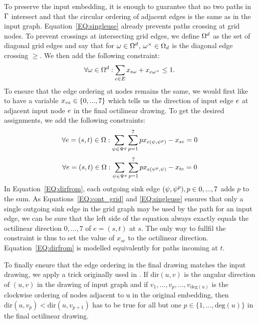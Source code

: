 \documentclass{sig-alternate-sigmod09}
\begin{document}
To preserve the input embedding, it is enough to guarantee that no two paths in $\Gamma$ intersect and that the circular ordering of adjacent edges is the same as in the input graph.
Equation~\ref{EQ:singleuse} already prevents paths crossing at grid nodes.
To prevent crossings at intersecting grid edges, we define $\Omega^d$ as the set of diagonal grid edges and say that for $\omega \in \Omega^d$, $\omega^{\times} \in \Omega_d$ is the diagonal edge crossing $\ge$. 
We then add the following constraint:
%
\begin{equation}
  \forall \ge \in \gE^d: \Psum{\ie \in \iE} \geused{\ie}{\ge} + \geused{\ie}{\ge^{\times}} \leq 1. \label{EQ:crossing}
\end{equation}
%
To ensure that the edge ordering at nodes remains the same, we would first like to have a variable $x_{ve} \in \{0, ..., 7\}$ which tells us the direction of input edge $e$ at adjacent input node $e$ in the final octilinear drawing.
To get the desired assignments, we add the following constraints:
%
\begin{equation}
  \forall e = (s, t) \in \Omega: \sum_{\psi \in \Psi^g} \sum_{p = 1}^7 p x_{e(\psi,  \psi^p)} - x_{se} = 0\label{EQ:dirfrom}
\end{equation}
\begin{equation}
  \forall e = (s, t) \in \Omega: \sum_{\psi \in \Psi^g} \sum_{p = 1}^7 p x_{e(\psi^p, \psi)} - x_{te} = 0\label{EQ:dirto}
\end{equation}
%
In Equation~\ref{EQ:dirfrom}, each outgoing sink edge $(\psi,  \psi^{p}), p \in {0, ..., 7}$ adds $p$ to the sum.
As Equations~\ref{EQ:cont_grid} and \ref{EQ:singleuse} ensures that only a single outgoing sink edge in the grid graph may be used by the path for an input edge, we can be sure that the left side of the equation always exactly equals the octilinear direction $0, ..., 7$ of $e = (s, t)$ at $s$.
The only way to fullfil the constraint is thus to set the value of $x_{se}$ to the octilinear direction.
Equation~\ref{EQ:dirfrom} is modelled equivalently for paths incoming at $t$.

To finally ensure that the edge ordering in the final drawing matches the input drawing, we apply a trick originally used in \cite{noellenburg}.
If $\text{dir}(u, v)$ is the angular direction of $(u, v)$ in the drawing of input graph and if $v_1, ..., v_p, ..., v_{\text{deg}(u)}$ is the clockwise ordering of nodes adjacent to u in the original embedding, then $\text{dir}(u, v_p) < \text{dir}(u, v_{p + 1})$ has to be true for all but one $p \in \{1, ..., \text{deg}(u)\}$ in the final octilinear drawing.
\end{document}
